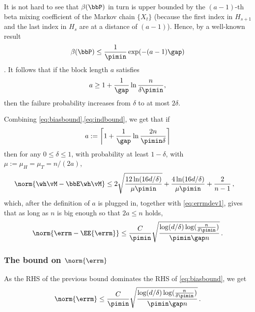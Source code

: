 It is not hard to see that $\beta(\bbP)$ in turn is upper bounded by 
the $(a-1)$-th beta mixing coefficient of the Markov chain $\{X_t\}$ (because the first
index in $H_{s+1}$ and the last index in $H_s$ are at a distance of $(a-1)$).
Hence, 
by a well-known result 
\[
  \beta(\bbP)
  \leq
  \frac{1}{\pimin} \exp(-(a-1)\gap)
\]
\citep[see, for instance,][]{bradley05}. 
It follows that if the block length $a$ satisfies
\begin{equation}
  \label{eq:block-length2}
  a \geq 1 + \frac{1}{\gap}\ln\frac{n}{\delta\pimin}
  ,
\end{equation}
then the failure probability increases from $\delta$ to at most
$2\delta$.

Combining \eqref{eq:biasbound},\eqref{eq:indbound}, we get that if
\[
  a := \left\lceil 1 + \frac{1}{\gap}\ln\frac{2n}{\pimin\delta} \right\rceil
\]
then for any $0\le \delta \le 1$, with probability at least $1-\delta$, with $\mu := \mu_H = \mu_T=n/(2a)$,
\begin{align*}
\norm{\wh\vM - \bbE \wh\vM }
& \le 
  2\sqrt{
    \frac{12\ln(16d/\delta)}{\mu\pimin}
  }
  +
  \frac{4\ln(16d/\delta)}{\mu\pimin}
  + 
  \frac{2}{n-1}\,,
\end{align*}
which, after the definition of $a$ is plugged in,
together with \eqref{eq:errmdev1},
 gives that as long as $n$ is big enough so that $2a\le n$ holds, 
\begin{align*}
\norm{\errm-\EE{\errm}}
\le \frac{C}{\pimin}
\sqrt{
    \frac{\log(d/\delta)\log(\frac{n}{\delta\pimin})}{\pimin\gap n}
  }
  \,.
\end{align*}
\subsubsection{The bound on $\norm{\errm}$}
As the RHS of the previous bound dominates the RHS of \eqref{eq:biasbound},
we get 
\begin{align}
\label{eq:doubletbound}
\norm{\errm}
\le \frac{C}{\pimin}
\sqrt{
    \frac{\log(d/\delta)\log(\frac{n}{\delta\pimin})}{\pimin\gap n}
  }\,.
\end{align}


